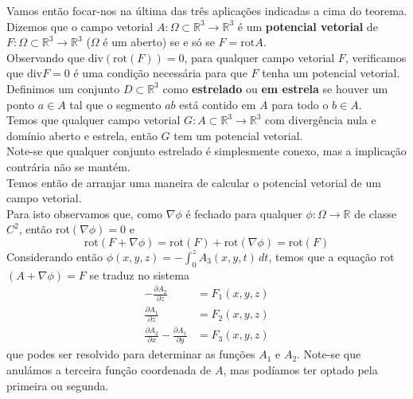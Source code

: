 \documentclass{article}
\newcommand{\R}{\mathbb{R}}
\begin{document}
Vamos então focar-nos na última das três aplicações indicadas a cima do teorema. Dizemos que o campo vetorial $A: \Omega \subset \R^3 \to \R^3$ é um \textbf{potencial vetorial} de $F: \Omega \subset \R^3 \to \R^3$ ($\Omega$ é um aberto) se e só se $F = \text{rot} A$.\\
Observando que $\text{div}(\text{rot}(F)) = 0$, para qualquer campo vetorial $F$, verificamos que $\text{div}F = 0$ é uma condição necessária para que $F$ tenha um potencial vetorial.\\
Definimos um conjunto $D \subset \R^3$ como \textbf{estrelado} ou \textbf{em estrela} se houver um ponto $a \in A$ tal que o segmento $ab$ está contido em $A$ para todo o $b \in A$.\\
Temos que qualquer campo vetorial $G: A \subset \R^3 \to \R^3$ com divergência nula e domínio aberto e estrela, então $G$ tem um potencial vetorial.\\
Note-se que qualquer conjunto estrelado é simplesmente conexo, mas a implicação contrária não se mantém.\\
Temos então de arranjar uma maneira de calcular o potencial vetorial de um campo vetorial.\\
Para isto observamos que, como $\nabla \phi$ é fechado para qualquer $\phi: \Omega \to \R$ de classe $C^2$, então rot$(\nabla \phi) = 0$ e 
$$ \text{rot}(F+\nabla \phi) = \text{rot}(F) + \text{rot}(\nabla \phi) = \text{rot}(F) $$
Considerando então $\phi(x,y,z) = -\int_0^z A_3(x,y,t) \, dt$, temos que a equação rot$(A+\nabla \phi) = F$ se traduz no sistema
\begin{align*}
-\frac{\partial A_2}{\partial z} &= F_1(x,y,z) \\
\frac{\partial A_1}{\partial z} &= F_2(x,y,z) \\
\frac{\partial A_2}{\partial x} - \frac{\partial A_1}{\partial y} &= F_3(x,y,z)
\end{align*}
que podes ser resolvido para determinar as funções $A_1$ e $A_2$. Note-se que anulámos a terceira função coordenada de $A$, mas podíamos ter optado pela primeira ou segunda.
\end{document}
